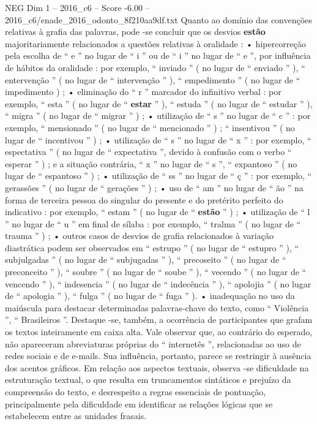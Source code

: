 \begin{textsample}{NEG Dim 1 – 2016\_c6 – Score -6.00 – 2016\_c6/enade\_2016\_odonto\_8f210aa9df.txt}
Quanto ao domínio das convenções relativas à grafia das palavras, pode -se concluir que os desvios \textbf{estão} majoritariamente relacionados a questões relativas à oralidade : • hipercorreção pela escolha de “ e ” no lugar de “ i ” ou de “ i ” no lugar de “ e ”, por influência de hábitos da oralidade : por exemplo, “ inviado ” ( no lugar de “ enviado ” ), “ entervenção ” ( no lugar de “ intervenção ” ), “ empedimento ” ( no lugar de “ impedimento ) ; • eliminação do “ r ” marcador do infinitivo verbal : por exemplo, “ esta ” ( no lugar de “ \textbf{estar} ” ), “ estuda ” ( no lugar de “ estudar ” ), “ migra ” ( no lugar de “ migrar ” ) ; • utilização de “ s ” no lugar de “ c ” : por exemplo, “ mensionado ” ( no lugar de “ mencionado ” ) ; “ insentivou ” ( no lugar de “ incentivou ” ) ; • utilização de “ s ” no lugar de “ x ” : por exemplo, “ espectativa ” ( no lugar de “ expectativa ”, devido à confusão com o verbo “ esperar ” ) ; e a situação contrária, “ x ” no lugar de “ s ”, “ expantoso ” ( no lugar de “ espantoso ” ) ; • utilização de “ ss ” no lugar de “ ç ” : por exemplo, “ gerassões ” ( no lugar de “ gerações ” ) ; • uso de “ am ” no lugar de “ ão ” na forma de terceira pessoa do singular do presente e do pretérito perfeito do indicativo : por exemplo, “ estam ” ( no lugar de “ \textbf{estão} ” ) ; • utilização de “ l ” no lugar de “ u ” em final de sílaba : por exemplo, “ tralma ” ( no lugar de “ trauma ” ) ; • outros casos de desvios de grafia relacionados à variação diastrática podem ser observados em “ estrupo ” ( no lugar de “ estupro ” ), “ subjulgadas ” ( no lugar de “ subjugadas ” ), “ precoseito ” ( no lugar de “ preconceito ” ), “ soubre ” ( no lugar de “ soube ” ), “ vecendo ” ( no lugar de “ vencendo ” ), “ indesencia ” ( no lugar de “ indecência ” ), “ apolojia ” ( no lugar de “ apologia ” ), “ fulga ” ( no lugar de “ fuga ” ). • inadequação no uso da maiúscula para destacar determinadas palavras-chave do texto, como “ Violência ”, “ Brasileiros ”.
Destaque -se, também, a ocorrência de participantes que grafam os textos inteiramente em caixa alta.
Vale observar que, ao contrário do esperado, não apareceram abreviaturas próprias do “ internetês ”, relacionadas ao uso de redes sociais e de e-mails.
Sua influência, portanto, parece se restringir à ausência dos acentos gráficos.
Em relação aos aspectos textuais, observa -se dificuldade na estruturação textual, o que resulta em truncamentos sintáticos e prejuízo da compreensão do texto, e desrespeito a regras essenciais de pontuação, principalmente pela dificuldade em identificar as relações lógicas que se estabelecem entre as unidades frasais.

\end{textsample}
